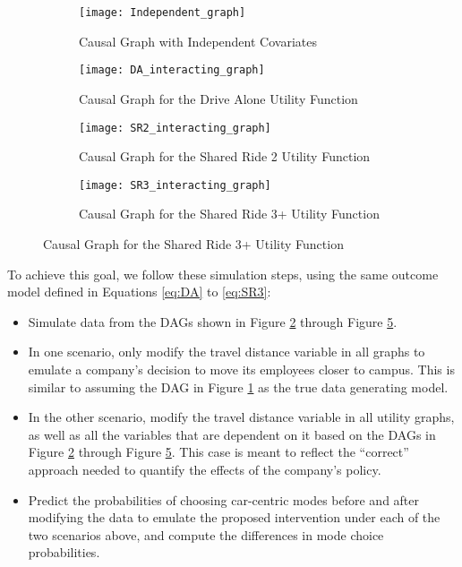 \begin{figure}
\centering
\begin{subfigure}[b]{0.75\textwidth}
   \texttt{[image: Independent\_graph]}
   \caption{Causal Graph with Independent Covariates}
   \label{fig:IND_GRAPH}
\end{subfigure}

\begin{subfigure}[b]{0.75\textwidth}
   \texttt{[image: DA\_interacting\_graph]}
   \caption{Causal Graph for the Drive Alone Utility Function}
   \label{fig:DA_causal_2}
\end{subfigure}

\begin{subfigure}[b]{0.75\textwidth}
   \texttt{[image: SR2\_interacting\_graph]}
   \caption{Causal Graph for the Shared Ride 2 Utility Function}
   \label{fig:SR2_causal_2}
\end{subfigure}

\begin{subfigure}[b]{0.75\textwidth}
   \texttt{[image: SR3\_interacting\_graph]}
   \caption{Causal Graph for the Shared Ride 3+ Utility Function}
   \label{fig:SR3_causal_2}
\end{subfigure}

\end{figure}

To achieve this goal, we follow these simulation steps, using the same outcome model defined in Equations \ref{eq:DA} to \ref{eq:SR3}:
\begin{itemize}
   \item Simulate data from the DAGs shown in Figure \ref{fig:DA_causal_2} through Figure \ref{fig:SR3_causal_2}.
   \item In one scenario, only modify the travel distance variable in all graphs to emulate a company's decision to move its employees closer to campus. This is similar to assuming the DAG in Figure \ref{fig:IND_GRAPH} as the true data generating model.
   \item In the other scenario, modify the travel distance variable in all utility graphs, as well as all the variables that are dependent on it based on the DAGs in Figure \ref{fig:DA_causal_2} through Figure \ref{fig:SR3_causal_2}. This case is meant to reflect the ``correct'' approach needed to quantify the effects of the company's policy.
   \item Predict the probabilities of choosing car-centric modes before and after modifying the data to emulate the proposed intervention under each of the two scenarios above, and compute the differences in mode choice probabilities.
\end{itemize}

